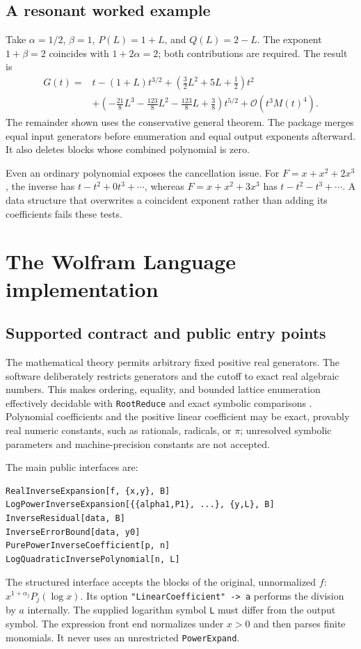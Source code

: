 \documentclass[11pt,a4paper]{article}
\newcommand{\OO}{\mathcal O}
\theoremstyle{definition}
\begin{document}
\subsection{A resonant worked example}
Take \(\alpha=1/2\), \(\beta=1\),
\(P(L)=1+L\), and \(Q(L)=2-L\). The exponent \(1+\beta=2\) coincides with
\(1+2\alpha=2\); both contributions are required. The result is
\begin{align}\label{eq:resonant}
 G(t)={}&t-(1+L)t^{3/2}
 +\left(\frac32L^2+5L+\frac12\right)t^2\\
 &+\left(-\frac{21}{8}L^3-\frac{123}{8}L^2
         -\frac{123}{8}L+\frac38\right)t^{5/2}
 +\OO(t^3M(t)^4).\nonumber
\end{align}
The remainder shown uses the conservative general theorem. The package
merges equal input generators before enumeration and equal output exponents
afterward. It also deletes blocks whose combined polynomial is zero.

Even an ordinary polynomial exposes the cancellation issue. For
\(F=x+x^2+2x^3\), the inverse has \(t-t^2+0t^3+\cdots\), whereas
\(F=x+x^2+3x^3\) has \(t-t^2-t^3+\cdots\). A data structure that overwrites a
coincident exponent rather than adding its coefficients fails these tests.

\section{The Wolfram Language implementation}
\subsection{Supported contract and public entry points}
The mathematical theory permits arbitrary fixed positive real generators.
The software deliberately restricts generators and the cutoff to exact real
algebraic numbers. This makes ordering, equality, and bounded lattice
enumeration effectively decidable with \texttt{RootReduce} and exact
symbolic comparisons \cite{rootreduce,algebraics}. Polynomial coefficients
and the positive linear coefficient may be exact, provably real numeric
constants, such as rationals, radicals, or \(\pi\); unresolved symbolic
parameters and machine-precision constants are not accepted.

The main public interfaces are:
\begin{lstlisting}
RealInverseExpansion[f, {x,y}, B]
LogPowerInverseExpansion[{{alpha1,P1}, ...}, {y,L}, B]
InverseResidual[data, B]
InverseErrorBound[data, y0]
PurePowerInverseCoefficient[p, n]
LogQuadraticInversePolynomial[n, L]
\end{lstlisting}
The structured interface accepts the blocks of the original, unnormalized
\(f\): \(x^{1+\alpha_j}P_j(\log x)\). Its option
\texttt{"LinearCoefficient" -> a} performs the division by \(a\) internally.
The supplied logarithm symbol \texttt{L} must differ from the output symbol.
The expression front end normalizes under \(x>0\) and then parses finite
monomials. It never uses an unrestricted \texttt{PowerExpand}.
\end{document}
